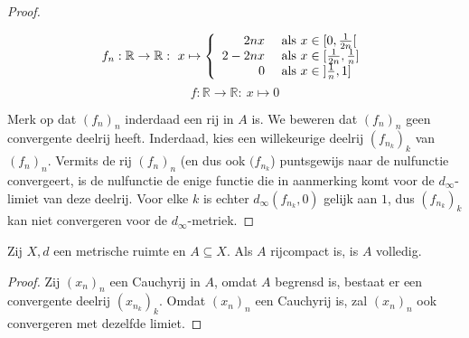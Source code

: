 \documentclass[main.tex]{subfiles}
\begin{document}
\begin{tvb}
\begin{proof}
    \noindent
    \begin{minipage}{.45\textwidth}
      \begin{figure}[H]
        \centering
      \end{figure}
    \end{minipage}
    \begin{minipage}{.45\textwidth}
      \[
      f_{n}: \mathbb{R} \rightarrow \mathbb{R}:\ x \mapsto
      \left\{
        \begin{array}{rl}
          2nx   & \text{ als } x \in \interval[open right]{0}{\frac{1}{2n}}\\
          2-2nx & \text{ als } x \in \interval{\frac{1}{2n}}{\frac{1}{n}}\\
          0     & \text{ als } x \in \interval[open left ]{\frac{1}{n}}{1}\\
        \end{array}
      \right.
      \]
      \[ f: \mathbb{R} \rightarrow \mathbb{R}:\ x \mapsto 0 \]
    \end{minipage}

    Merk op dat $(f_{n})_{n}$ inderdaad een rij in $A$ is.
    We beweren dat $(f_{n})_{n}$ geen convergente deelrij heeft.
    Inderdaad, kies een willekeurige deelrij $(f_{n_{k}})_{k}$ van $(f_{n})_{n}$.
    Vermits de rij $(f_{n})_{n}$ (en dus ook $(f_{n_{k}}$) puntsgewijs naar de nulfunctie convergeert, is de nulfunctie de enige functie die in aanmerking komt voor de $d_{\infty}$-limiet van deze deelrij.
    Voor elke $k$ is echter $d_{\infty}(f_{n_{k}},0)$ gelijk aan $1$, dus $(f_{n_{k}})_{k}$ kan niet convergeren voor de $d_{\infty}$-metriek.
  \end{proof}
\end{tvb}

\begin{bst}
  \label{st:rijcompact-dan-volledig}
  Zij $X,d$ een metrische ruimte en $A \subseteq X$.
  Als $A$ rijcompact is, is $A$ volledig.
  
  \begin{proof}
    Zij $(x_{n})_{n}$ een Cauchyrij in $A$, omdat $A$ begrensd is, bestaat er een convergente deelrij $(x_{n_{k}})_{k}$.
    Omdat $(x_{n})_{n}$ een Cauchyrij is, zal $(x_{n})_{n}$ ook convergeren met dezelfde limiet.
  \end{proof}    
\end{bst}
\end{document}
